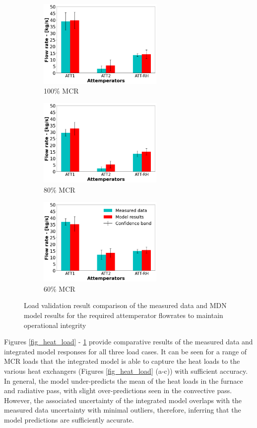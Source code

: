\documentclass[a4paper,fleqn]{cas-sc}
\begin{document}
\begin{figure}
\centering
\begin{subfigure}{0.33\textwidth}
    \includegraphics[width=\linewidth, height = 4.25cm]{100_CASE_ATTEMP}
    \caption{100\% MCR}
\end{subfigure}\hfill %
\begin{subfigure}{0.33\textwidth}
    \includegraphics[width=\linewidth, height = 4.25cm]{80_CASE_ATTEMP}
    \caption{80\% MCR}
\end{subfigure}\hfill
\begin{subfigure}{0.33\textwidth}
    \includegraphics[width=\linewidth, height = 4.25cm]{60_CASE_ATTEMP}
    \caption{60\% MCR}
\end{subfigure}
\caption{Load validation result comparison of the measured data and MDN model results for the required attemperator flowrates to maintain operational integrity}
\label{fig_attemp}
\end{figure}

Figures \ref{fig_heat_load} - \ref{fig_attemp} provide comparative results of the measured data and integrated model responses for all three load cases. It can be seen for a range of MCR loads that the integrated model is able to capture the heat loads to the various heat exchangers (Figures \ref{fig_heat_load} (a-c)) with sufficient accuracy. In general, the model under-predicts the mean of the heat loads in the furnace and radiative pass, with slight over-predictions seen in the convective pass. However, the associated uncertainty of the integrated model overlaps with the measured data uncertainty with minimal outliers, therefore, inferring that the model predictions are sufficiently accurate.\\ 
\end{document}
